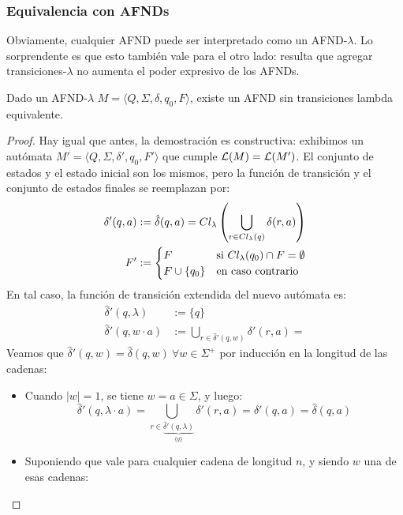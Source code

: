 \subsubsection{Equivalencia con AFNDs}

Obviamente, cualquier AFND puede ser interpretado como un AFND-$\lambda$. Lo sorprendente es que esto también vale para el otro lado: resulta que agregar transiciones-$\lambda$ no aumenta el poder expresivo de los AFNDs.

\begin{theorem*}
    Dado un AFND-$\lambda$ $M = \langle Q, \Sigma, \delta, q_0, F \rangle$, existe un AFND sin transiciones lambda equivalente.
\end{theorem*}
\begin{proof}
    Hay igual que antes, la demostración es constructiva: exhibimos un autómata $M' = \langle Q, \Sigma, \delta', q_0, F' \rangle$ que cumple $\mathcal{L}(M) = \mathcal{L}(M')$. El conjunto de estados y el estado inicial son los mismos, pero la función de transición y el conjunto de estados finales se reemplazan por:
    $$
    \begin{aligned}
        \delta'(q, a) & := \hat \delta (q, a) = Cl_\lambda\left(\bigcup_{r \in Cl_\lambda(q)} \delta(r, a)\right) \\
        F' & := \begin{cases}
            F & \text{si } Cl_\lambda (q_0) \cap F = \emptyset \\
            F \cup \{q_0\} & \text{en caso contrario}
        \end{cases}
    \end{aligned}
    $$
    En tal caso, la función de transición extendida del nuevo autómata es:
    $$
    \begin{aligned}
        \hat \delta'(q, \lambda) & := \{q\} \\
        \hat \delta'(q, w \cdot a) & := \bigcup_{r \in \hat \delta'(q, w)} \delta'(r, a) = 
    \end{aligned}
    $$
    Veamos que $\hat \delta'(q, w) = \hat \delta(q, w) \ \forall w \in \Sigma^+$ por inducción en la longitud de las cadenas:
    \begin{itemize}
        \item Cuando $|w| = 1$, se tiene $w = a \in \Sigma$, y luego:
        $$
        \hat \delta'(q, \lambda \cdot a)
        = \bigcup_{r \in \underbrace{\hat \delta'(q, \lambda)}_{\{q\}} } \delta'(r, a)
        = \delta'(q, a) = \hat \delta(q, a)
        $$
        \item Suponiendo que vale para cualquier cadena de longitud $n$, y siendo $w$ una de esas cadenas:

\end{itemize}
\end{proof}
